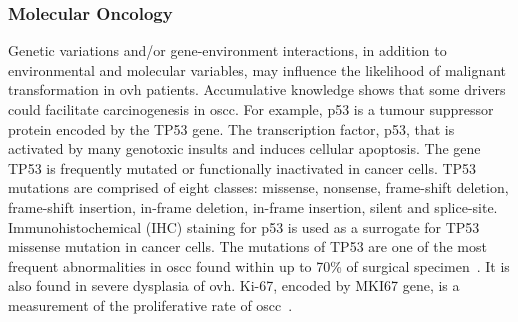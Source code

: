 \documentclass[12pt, a4paper]{article}
\begin{document}

\subsubsection{Molecular Oncology}
Genetic variations and/or gene-environment interactions, in addition to environmental and molecular variables, may influence the likelihood of malignant transformation in \acrshort{ovh} patients.
Accumulative knowledge shows that some drivers could facilitate carcinogenesis in \acrshort{oscc}.
For example, p53 is a tumour suppressor protein encoded by the TP53 gene.
The transcription factor, p53, that is activated by many genotoxic insults and induces cellular apoptosis. 
The gene TP53 is frequently mutated or functionally inactivated in cancer cells.
TP53 mutations are comprised of eight classes: missense, nonsense, frame-shift deletion, frame-shift insertion, in-frame deletion, in-frame insertion, silent and splice-site.
Immunohistochemical (IHC) staining for p53 is used as a surrogate for TP53 missense mutation in cancer cells. 
The mutations of TP53 are one of the most frequent abnormalities in \acrshort{oscc} found within up to 70\% of surgical specimen~\citep{Alsner2001, Singh2016, Wang2017, WARD2018}. It is also found in severe dysplasia of \acrshort{ovh}.
Ki-67, encoded by MKI67 gene, is a measurement of the proliferative rate of \acrshort{oscc}~\citep{Silva2004}.
\end{document}
